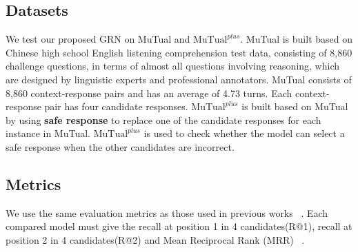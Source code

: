 \documentclass[letterpaper]{article} %
\begin{document}
\subsection{Datasets}
We test our proposed GRN on MuTual and $\text{MuTual}^{plus}$. MuTual is built based on Chinese high school English listening comprehension test data, consisting of 8,860 challenge questions, in terms of almost all questions involving reasoning, which are designed by linguistic experts and professional annotators. MuTual consists of 8,860 context-response pairs and has an average of 4.73 turns. Each context-response pair has four candidate responses. $\text{MuTual}^{plus}$ is built based on MuTual by using \textbf{safe response}  to replace one of the candidate responses for each instance in MuTual. $\text{MuTual}^{plus}$ is used to check whether the model can select a safe response when the other candidates are incorrect.

\subsection{Metrics}
We use the same evaluation metrics as those used in previous works ~\cite{mutual2020}. Each compared model must give the recall at position 1 in 4 candidates(R@1), recall at position 2 in 4 candidates(R@2) and Mean Reciprocal Rank (MRR) ~\cite{Ricardo2016}.
\end{document}
